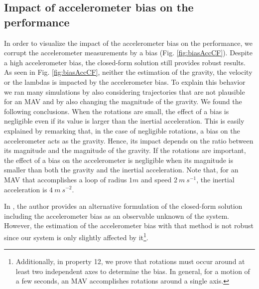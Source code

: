 \documentclass[letterpaper, 10 pt, conference]{ieeeconf}  %
\begin{document}
\subsection{Impact of accelerometer bias on the performance \label{sec:biasAcc}}
In order to visualize the impact of the accelerometer bias on the performance,
we corrupt the accelerometer measurements by a bias (Fig. \ref{fig:biasAccCF}).
Despite a high accelerometer bias, the closed-form solution still provides robust results.
As seen in Fig. \ref{fig:biasAccCF}, neither the estimation of the gravity, the velocity or the lambdas is impacted by the accelerometer bias.
To explain this behavior we ran many simulations by also considering trajectories that are not plausible for an MAV and by also changing the magnitude of the gravity. We found the following conclusions. When the rotations are small, the effect of a bias is negligible even if its value is larger than the inertial acceleration. This is easily explained by remarking that, in the case of negligible rotations, a bias on the accelerometer acts as the gravity. Hence, its impact depends on the ratio between its magnitude and the magnitude of the gravity.
If the rotations are important, the effect of a bias on the accelerometer is negligible when its magnitude is smaller than both the gravity and the inertial acceleration. Note that, for an MAV that accomplishes a loop of radius $1m$ and speed $2~m~s^{-1}$, the inertial acceleration is $4~m~s^{-2}$.

In \cite{Martinelli2014}, the author provides an alternative formulation of the closed-form solution including the accelerometer bias as an observable unknown of the system.
However, the estimation of the accelerometer bias with that method is not robust since our system is only slightly affected by it\footnote{Additionally, in \cite{Martinelli2014} property 12, we prove that rotations must occur around at least two independent axes to determine the bias. In general, for a motion of a few seconds, an MAV accomplishes rotations around a single axis.}.
\end{document}
